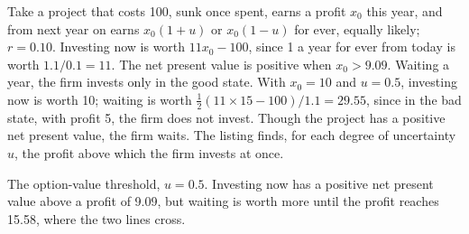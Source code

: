 Take a project that costs 100, sunk once spent, earns a profit $x_0$ this year, and from next year on earns $x_0(1 + u)$ or $x_0(1 - u)$ for ever,
equally likely; $r = 0.10$. Investing now is worth $11x_0 - 100$, since 1 a year for ever from today is worth $1.1/0.1 = 11$. The net present value is positive
when $x_0 > 9.09$. Waiting a year, the firm invests only in the good state. With $x_0 = 10$ and $u = 0.5$, investing now is worth 10; waiting is worth
$\tfrac12(11 \times 15 - 100)/1.1 = 29.55$, since in the bad state, with profit 5, the firm does not invest. Though the project has a positive net present value, the firm waits.
The listing finds, for each degree of uncertainty $u$, the profit above which the firm invests at once.

\label{lst:b2:investment:wait}

\label{out:b2:investment:wait}

\begin{omfigure}

{\small The option-value threshold, $u = 0.5$. Investing now has a positive net present value above a profit of 9.09, but waiting is worth
more until the profit reaches 15.58, where the two lines cross.}
\end{omfigure}

